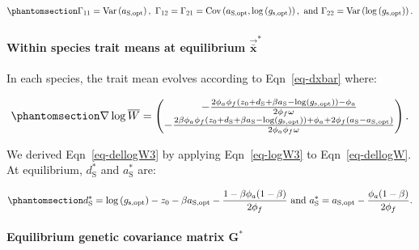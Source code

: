 \documentclass[
  letterpaper,
  DIV=11,
  numbers=noendperiod]{scrartcl}
\let\oldparagraph\paragraph
\renewcommand{\paragraph}[1]{\oldparagraph{#1}\mbox{}}
\begin{document}
\begin{equation}\phantomsection\label{eq-gamma}{\Gamma_{11} = \text{Var} \left( a_\mathrm{S,opt} \right),~\Gamma_{12} = \Gamma_{21} = \text{Cov} \left( a_\mathrm{S,opt}, \log \left( g_\mathrm{s,opt} \right) \right),~\text{and}~\Gamma_{22} = \text{Var} \left( \log \left( g_\mathrm{s,opt} \right) \right).}\end{equation}

\paragraph{\texorpdfstring{Within species trait means at equilibrium
\(\vec{\bar{\mathbf{x}}}^*\)}{Within species trait means at equilibrium \textbackslash vec\{\textbackslash bar\{\textbackslash mathbf\{x\}\}\}\^{}*}}\label{within-species-trait-means-at-equilibrium-vecbarmathbfx-2}

In each species, the trait mean evolves according to Eqn~\ref{eq-dxbar}
where:

\begin{equation}\phantomsection\label{eq-dellogW3}{\nabla \log \overline{W} = \begin{pmatrix} -\frac{2 \phi_a \phi_f \left( z_0 + d_\mathrm{S} + \beta a_\mathrm{S} - \log \left( g_{\mathrm{s,opt}} \right) \right) - \phi_a}{2 \phi_f \omega} \\ -\frac{2 \beta \phi_a \phi_f \left( z_0 + d_\mathrm{S} + \beta a_\mathrm{S} - \log \left( g_\mathrm{s,opt} \right) \right) + \phi_a + 2 \phi_f \left( a_\mathrm{S} - a_\mathrm{S,opt} \right)}{2 \phi_a \phi_f \omega} \end{pmatrix}.}\end{equation}

We derived Eqn~\ref{eq-dellogW3} by applying Eqn~\ref{eq-logW3} to
Eqn~\ref{eq-dellogW}. At equilibrium, \(d_\mathrm{S}^*\) and
\(a_\mathrm{S}^*\) are:

\begin{equation}\phantomsection\label{eq-xstar3}{d_\mathrm{S}^* = \log \left( g_\mathrm{s,opt} \right) - z_0 - \beta a_\mathrm{S,opt} - \frac{1 - \beta \phi_a (1 - \beta)}{2 \phi_f} ~\text{and}~a_\mathrm{S}^* = a_\mathrm{S,opt} - \frac{\phi_a ( 1 - \beta)}{2 \phi_f}.}\end{equation}

\paragraph{\texorpdfstring{Equilibrium genetic covariance matrix
\(\mathbf{G}^*\)}{Equilibrium genetic covariance matrix \textbackslash mathbf\{G\}\^{}*}}\label{equilibrium-genetic-covariance-matrix-mathbfg-2}
\end{document}

